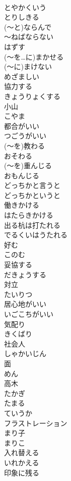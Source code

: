 \documentclass[8pt]{extreport}
\begin{document}
\begin{CJK}{UTF8}{min}
\\	とやかくいう	
\\	とりしきる	
\\	(～と)ならんで	
\\	～ねばならない	
\\	はずす	
\\	(～を…に)まかせる	
\\	(～に)まけない	
\\	めざましい	
\\	協力する	
\\	きょうりょくする
\\	小山	
\\	こやま
\\	都合がいい	
\\	つごうがいい
\\	(～を)教わる	
\\	おそわる
\\	(～を)重んじる	
\\	おもんじる
\\	どっちかと言うと	
\\	どっちかというと
\\	働きかける	
\\	はたらきかける
\\	出る杭は打たれる	
\\	でるくいはうたれる
\\	好む	
\\	このむ
\\	妥協する	
\\	だきょうする
\\	対立	
\\	たいりつ
\\	居心地がいい	
\\	いごこちがいい
\\	気配り	
\\	きくばり
\\	社会人	
\\	しゃかいじん
\\	面	
\\	めん
\\	高木	
\\	たかぎ
\\	たまる	
\\	ていうか	
\\	フラストレーション	
\\	まり子	
\\	まりこ
\\	入れ替える	
\\	いれかえる
\\	印象に残る	

\end{CJK}
\end{document}
